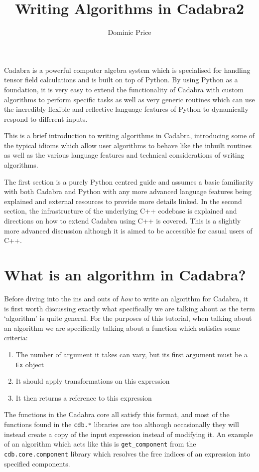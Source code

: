\documentclass{article}
\title{Writing Algorithms in Cadabra2}
\author{Dominic Price}
\date{}
\begin{document}
\maketitle

Cadabra is a powerful computer algebra system which is specialised for handling tensor field calculations
and is built on top of Python. By using Python as a foundation, it is very easy to extend the functionality of
Cadabra with custom algorithms to perform specific tasks as well as very generic routines which can use the 
incredibly flexible and reflective language features of Python to dynamically respond to different inputs.

This is a brief introduction to writing algorithms in Cadabra, introducing some of the typical idioms which allow
user algorithms to behave like the inbuilt routines as well as the various language features and technical 
considerations of writing algorithms.

The first section is a purely Python centred guide and assumes a basic familiarity with both Cadabra and Python
with any more advanced language features being explained and external resources to provide more details linked.
In the second section, the infrastructure of the underlying C++ codebase is explained and directions on how to
extend Cadabra using C++ is covered. This is a slightly more advanced discussion although it is aimed to be
accessible for casual users of C++. 

\section{What is an algorithm in Cadabra?}

Before diving into the ins and outs of \emph{how} to write an algorithm for Cadabra, it is first worth discussing exactly
what specifically we are talking about as the term `algorithm' is quite general. For the purposes of this tutorial, when
talking about an algorithm we are specifically talking about a function which satisfies some criteria:
\begin{enumerate}
	\item The number of argument it takes can vary, but its first argument must be a \verb|Ex| object
	\item It should apply transformations on this expression
	\item It then returns a reference to this expression
\end{enumerate}
The functions in the Cadabra core all satisfy this format, and most of the functions found in the \verb|cdb.*| libraries are
too although occasionally they will instead create a copy of the input expression instead of modifying it. An example of an
algorithm which acts like this is \verb|get_component| from the \verb|cdb.core.component| library which resolves the free
indices of an expression into specified components.
\end{document}
